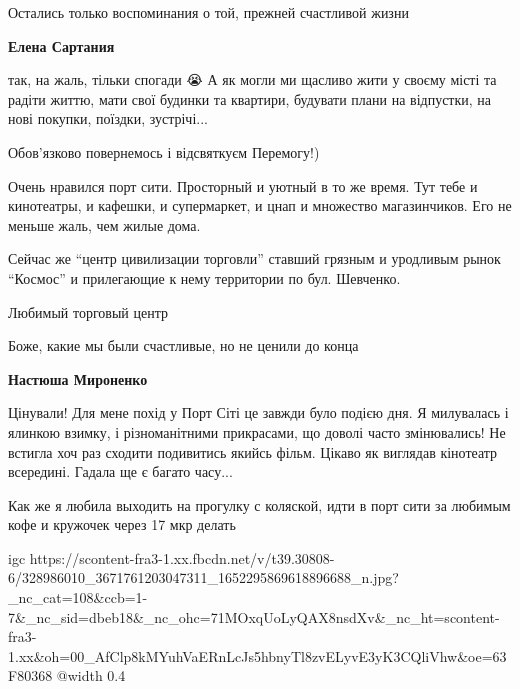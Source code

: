 
Остались только воспоминания о той, прежней счастливой жизни

\begin{itemize} %
\textbf{Елена Сартания} 

так, на жаль, тільки спогади 😭 А як могли ми щасливо жити у своєму місті та
радіти життю, мати свої будинки та квартири, будувати плани на відпустки, на
нові покупки, поїздки, зустрічі...


Обов'язково повернемось і відсвяткуєм Перемогу!)

\end{itemize} %


Очень нравился порт сити. Просторный и уютный в то же время. Тут тебе и
кинотеатры, и кафешки, и супермаркет, и цнап и множество магазинчиков. Его не
меньше жаль, чем жилые дома.

\begin{itemize} %

Сейчас же \enquote{центр цивилизации торговли} ставший грязным и уродливым
рынок \enquote{Космос} и прилегающие к нему территории по бул. Шевченко.
\end{itemize} %


Любимый торговый центр


Боже, какие мы были счастливые, но не ценили до конца

\begin{itemize} %
\textbf{Настюша Мироненко} 

Цінували! Для мене похід у Порт Сіті це завжди було подією дня. Я милувалась і
ялинкою взимку, і різноманітними прикрасами, що доволі часто змінювались! Не
встигла хоч раз сходити подивитись якийсь фільм. Цікаво як виглядав кінотеатр
всередині. Гадала ще є багато часу...

\end{itemize} %


Как же я любила выходить на прогулку с коляской, идти в порт сити за любимым
кофе и кружочек через 17 мкр делать🥺😢

\ifcmt
  igc https://scontent-fra3-1.xx.fbcdn.net/v/t39.30808-6/328986010_3671761203047311_1652295869618896688_n.jpg?_nc_cat=108&ccb=1-7&_nc_sid=dbeb18&_nc_ohc=71MOxqUoLyQAX8nsdXv&_nc_ht=scontent-fra3-1.xx&oh=00_AfClp8kMYuhVaERnLcJs5hbnyTl8zvELyvE3yK3CQliVhw&oe=63F80368
	@width 0.4
\fi


